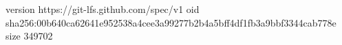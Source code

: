 version https://git-lfs.github.com/spec/v1
oid sha256:00b640ca62641e952538a4cee3a99277b2b4a5bff4df1fb3a9bbf3344cab778e
size 349702

